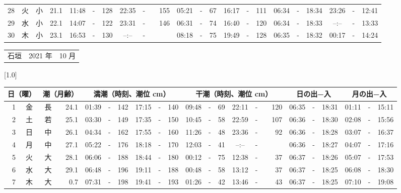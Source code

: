 \documentclass[12pt,a4j]{jsarticle}
\begin{document}
\begin{table}[htbp]
\begin{center}
{\begin{tabular}{|rc|cr|ccrccr|ccrccr|ccc|ccc|}
28 & 火 & 小 & 21.1 &  11:48 &-& 128 &  22:35 &-& 155 &  05:21 &-&  67 &  16:17 &-& 111 & 06:34 & -& 18:34 & 23:26 & -& 12:41 \\
29 & 水 & 小 & 22.1 &  14:07 &-& 122 &  23:31 &-& 146 &  06:31 &-&  74 &  16:40 &-& 120 & 06:34 & -& 18:33 & --:-- & -& 13:33 \\
30 & 木 & 小 & 23.1 &  16:53 &-& 130 &  --:-- &-&~~~~~ &  08:18 &-&  75 &  19:49 &-& 128 & 06:35 & -& 18:32 & 00:17 & -& 14:24 \\
   \hline
   \end{tabular}}
   \end{center}
\end{table}
\newpage
 \begin{table}[htbp]
 \begin{center}
 \begin{tabular}{lcc}
 \LARGE{石垣}  & \large{2021 年} & \large{10 月} \\
 \end{tabular}
 \end{center}
 \begin{center}
    \scalebox{0.7}[1.0]{
    \begin{tabular}{|rc|cr|ccrccr|ccrccr|ccc|ccc|}
    \hline
    \multicolumn{2}{|c|}{日（曜）} & \multicolumn{2}{c|}{潮（月齢）} & \multicolumn{6}{c|}{満潮（時刻、潮位 cm）} & \multicolumn{6}{c|}{干潮（時刻、潮位 cm）} & \multicolumn{3}{c|}{日の出−入} &  \multicolumn{3}{c|}{月の出−入}\\
 \hline
 1 & 金 & 長 & 24.1 &  01:39 &-& 142 &  17:15 &-& 140 &  09:48 &-&  69 &  22:11 &-& 120 & 06:35 & -& 18:31 & 01:11 & -& 15:11 \\
 2 & 土 & 若 & 25.1 &  03:30 &-& 149 &  17:35 &-& 150 &  10:45 &-&  58 &  22:59 &-& 107 & 06:36 & -& 18:30 & 02:08 & -& 15:56 \\
 3 & 日 & 中 & 26.1 &  04:34 &-& 162 &  17:55 &-& 160 &  11:26 &-&  48 &  23:36 &-&  92 & 06:36 & -& 18:28 & 03:07 & -& 16:37 \\
 4 & 月 & 中 & 27.1 &  05:22 &-& 176 &  18:18 &-& 170 &  12:03 &-&  41 &  --:-- &-&~~~~~ & 06:36 & -& 18:27 & 04:07 & -& 17:16 \\
 5 & 火 & 大 & 28.1 &  06:06 &-& 188 &  18:44 &-& 180 &  00:12 &-&  75 &  12:38 &-&  37 & 06:37 & -& 18:26 & 05:07 & -& 17:53 \\
 6 & 水 & 大 & 29.1 &  06:48 &-& 196 &  19:11 &-& 188 &  00:48 &-&  58 &  13:12 &-&  37 & 06:37 & -& 18:25 & 06:08 & -& 18:30 \\
 7 & 木 & 大 &  0.7 &  07:31 &-& 198 &  19:41 &-& 193 &  01:26 &-&  42 &  13:46 &-&  43 & 06:37 & -& 18:25 & 07:10 & -& 19:08 \\

\end{tabular}}
\end{center}
\end{table}
\end{document}
